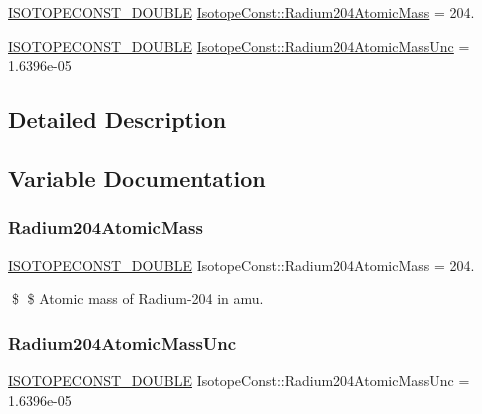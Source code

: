 \begin{DoxyCompactItemize}
\item 
\mbox{\hyperlink{group___isotope_const-_macros_ga8f45a7272ce02c0b4c65c44636ed719a}{I\+S\+O\+T\+O\+P\+E\+C\+O\+N\+S\+T\+\_\+\+D\+O\+U\+B\+LE}} \mbox{\hyperlink{group___isotope_const-_radium-_ra204_gaf64648c52ff2a8476a3360600830fac2}{Isotope\+Const\+::\+Radium204\+Atomic\+Mass}} = 204.
\item 
\mbox{\hyperlink{group___isotope_const-_macros_ga8f45a7272ce02c0b4c65c44636ed719a}{I\+S\+O\+T\+O\+P\+E\+C\+O\+N\+S\+T\+\_\+\+D\+O\+U\+B\+LE}} \mbox{\hyperlink{group___isotope_const-_radium-_ra204_gace2c5dc186f9b3cb1f6416706a3069e2}{Isotope\+Const\+::\+Radium204\+Atomic\+Mass\+Unc}} = 1.\+6396e-\/05
\end{DoxyCompactItemize}


\subsection{Detailed Description}


\subsection{Variable Documentation}
\mbox{\label{group___isotope_const-_radium-_ra204_gaf64648c52ff2a8476a3360600830fac2}} 
\subsubsection{\texorpdfstring{Radium204\+Atomic\+Mass}{Radium204AtomicMass}}
{\footnotesize\ttfamily \mbox{\hyperlink{group___isotope_const-_macros_ga8f45a7272ce02c0b4c65c44636ed719a}{I\+S\+O\+T\+O\+P\+E\+C\+O\+N\+S\+T\+\_\+\+D\+O\+U\+B\+LE}} Isotope\+Const\+::\+Radium204\+Atomic\+Mass = 204.}

\$ \$ Atomic mass of Radium-\/204 in amu. \mbox{\label{group___isotope_const-_radium-_ra204_gace2c5dc186f9b3cb1f6416706a3069e2}} 
\subsubsection{\texorpdfstring{Radium204\+Atomic\+Mass\+Unc}{Radium204AtomicMassUnc}}
{\footnotesize\ttfamily \mbox{\hyperlink{group___isotope_const-_macros_ga8f45a7272ce02c0b4c65c44636ed719a}{I\+S\+O\+T\+O\+P\+E\+C\+O\+N\+S\+T\+\_\+\+D\+O\+U\+B\+LE}} Isotope\+Const\+::\+Radium204\+Atomic\+Mass\+Unc = 1.\+6396e-\/05}

